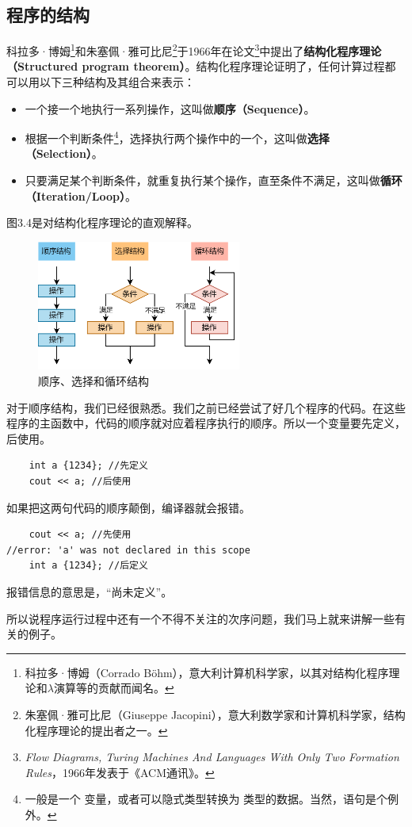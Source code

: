 \subsection*{程序的结构}
科拉多·博姆\footnote{科拉多·博姆（Corrado Böhm），意大利计算机科学家，以其对结构化程序理论和$\!\lambda\!$演算等的贡献而闻名。}和朱塞佩·雅可比尼\footnote{朱塞佩·雅可比尼（Giuseppe Jacopini），意大利数学家和计算机科学家，结构化程序理论的提出者之一。}于1966年在论文\footnote{\textit{Flow Diagrams, Turing Machines And Languages With Only Two Formation Rules}，1966年发表于《ACM通讯》。}中提出了\textbf{结构化程序理论（Structured program theorem）}。结构化程序理论证明了，任何计算过程都可以用以下三种结构及其组合来表示：
\begin{itemize}
    \item 一个接一个地执行一系列操作，这叫做\textbf{顺序（Sequence）}。
    \item 根据一个判断条件\footnote{一般是一个 \lstinline@bool@ 变量，或者可以隐式类型转换为 \lstinline@bool@ 类型的数据。当然，\lstinline@switch@ 语句是个例外。}，选择执行两个操作中的一个，这叫做\textbf{选择（Selection）}。
    \item 只要满足某个判断条件，就重复执行某个操作，直至条件不满足，这叫做\textbf{循环（Iteration/Loop）}。
\end{itemize}
图3.4是对结构化程序理论的直观解释。\par
\begin{figure}[htbp]
    \centering
    \includegraphics[width=0.6\textwidth]{../images/generalized_parts/03_structured_program_theorem_300.png}
    \caption{顺序、选择和循环结构}
\end{figure}
对于顺序结构，我们已经很熟悉。我们之前已经尝试了好几个程序的代码。在这些程序的主函数中，代码的顺序就对应着程序执行的顺序。所以一个变量要先定义，后使用。
\begin{lstlisting}
    int a {1234}; //先定义
    cout << a; //后使用
\end{lstlisting}
如果把这两句代码的顺序颠倒，编译器就会报错。
\begin{lstlisting}
    cout << a; //先使用
//error: 'a' was not declared in this scope
    int a {1234}; //后定义
\end{lstlisting}
报错信息的意思是，``\lstinline@a@ 尚未定义''。\par
所以说程序运行过程中还有一个不得不关注的次序问题，我们马上就来讲解一些有关的例子。\par
